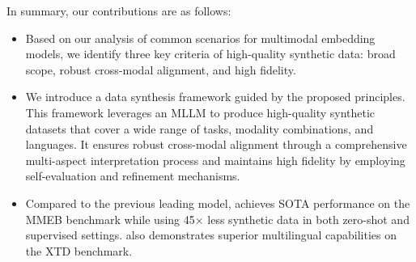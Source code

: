 In summary, our contributions are as follows:
\begin{itemize}
    \item Based on our analysis of common scenarios for multimodal embedding models, we identify three key criteria of high-quality synthetic data: broad scope, robust cross-modal alignment, and high fidelity.
    \item We introduce a data synthesis framework guided by the proposed principles. 
    This framework leverages an MLLM to produce high-quality synthetic datasets that cover a wide range of tasks, modality combinations, and languages. It ensures robust cross-modal alignment through a comprehensive multi-aspect interpretation process and maintains high fidelity by employing self-evaluation and refinement mechanisms.
    \item Compared to the previous leading model, \ours{} achieves SOTA performance on the MMEB benchmark while using 45× less synthetic data in both zero-shot and supervised settings.
    \ours{} also demonstrates superior multilingual capabilities on the XTD benchmark.
\end{itemize}


